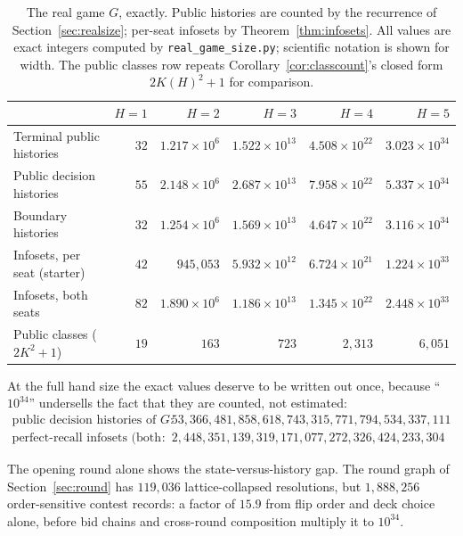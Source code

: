 \documentclass[11pt]{article}
\theoremstyle{plain}
\theoremstyle{definition}
\theoremstyle{remark}
\newcommand{\code}[1]{\texttt{\small #1}}
\begin{document}
\begin{table}[t]
\centering
\caption{The real game $G$, exactly. Public histories are counted by the
recurrence of Section~\ref{sec:realsize}; per-seat infosets by
Theorem~\ref{thm:infosets}. All values are exact integers computed by
\code{real\_game\_size.py}; scientific notation is shown for width. The
public classes row repeats Corollary~\ref{cor:classcount}'s closed form
$2K(H)^2+1$ for comparison.}
\label{tab:realsize}
\small
\begin{tabular}{@{}lrrrrr@{}}
\toprule
& $H=1$ & $H=2$ & $H=3$ & $H=4$ & $H=5$\\
\midrule
Terminal public histories & $32$ & $1.217\times10^{6}$ & $1.522\times10^{13}$ & $4.508\times10^{22}$ & $3.023\times10^{34}$\\
Public decision histories & $55$ & $2.148\times10^{6}$ & $2.687\times10^{13}$ & $7.958\times10^{22}$ & $5.337\times10^{34}$\\
Boundary histories        & $32$ & $1.254\times10^{6}$ & $1.569\times10^{13}$ & $4.647\times10^{22}$ & $3.116\times10^{34}$\\
Infosets, per seat (starter) & $42$ & $945{,}053$ & $5.932\times10^{12}$ & $6.724\times10^{21}$ & $1.224\times10^{33}$\\
Infosets, both seats      & $82$ & $1.890\times10^{6}$ & $1.186\times10^{13}$ & $1.345\times10^{22}$ & $2.448\times10^{33}$\\
Public classes ($2K^2{+}1$) & $19$ & $163$ & $723$ & $2{,}313$ & $6{,}051$\\
\bottomrule
\end{tabular}
\end{table}

At the full hand size the exact values deserve to be written out once,
because ``$10^{34}$'' undersells the fact that they are counted, not
estimated:
\begin{align*}
\text{public decision histories of } G:\quad
  &53{,}366{,}481{,}858{,}618{,}743{,}315{,}771{,}794{,}534{,}337{,}111\\
\text{perfect-recall infosets (both seats)}:\quad
  &2{,}448{,}351{,}139{,}319{,}171{,}077{,}272{,}326{,}424{,}233{,}304
\end{align*}

The opening round alone shows the state-versus-history gap. The round
graph of Section~\ref{sec:round} has $119{,}036$ lattice-collapsed
resolutions, but $1{,}888{,}256$ order-sensitive contest records: a factor
of $15.9$ from flip order and deck choice alone, before bid chains and
cross-round composition multiply it to $10^{34}$.
\end{document}
